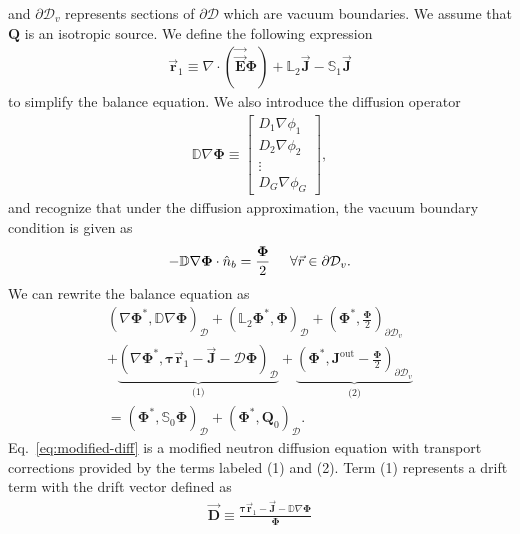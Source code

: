 %
and $\partial\mathcal{D}_v$ represents sections of $\partial\mathcal{D}$ which are vacuum
boundaries. We assume that $\bm{Q}$ is an isotropic source. We define the following expression
%
\begin{gather}
  \vec{\bm{r}}_1 \equiv \nabla\cdot(\vec{\vec{\bm{E}}}\bm{\Phi}) + \mathbb{L}_2\vec{\bm{J}} -
  \mathbb{S}_1\vec{\bm{J}} \label{eq:1st-moment}
\end{gather}
%
to simplify the balance equation. We also introduce the diffusion operator
%
\begin{gather}
  \mathbb{D}\nabla\bm{\Phi} \equiv
  \begin{bmatrix}
    D_1\nabla\phi_1 \\
    D_2\nabla\phi_2 \\
    \vdots \\
    D_G\nabla\phi_G
  \end{bmatrix},
\end{gather}
%
and recognize that under the diffusion approximation, the vacuum boundary condition is given as
%
\begin{gather}
  -\mathbb{D}\nabla\bm{\Phi}\cdot\hat{n}_b = \frac{\bm{\Phi}}{2} \hspace{0.5cm} \forall\vec{r}\in\partial
  \mathcal{D}_v.
\end{gather}
%
We can rewrite the balance equation as
%
\begin{multline}
  \left(\nabla\bm{\Phi}^*, \mathbb{D}\nabla\bm{\Phi}\right)_\mathcal{D}
  + \left(\mathbb{L}_2\bm{\Phi}^*,\bm{\Phi}\right)_\mathcal{D}
  + \left(\bm{\Phi}^*,\frac{\bm{\Phi}}{2}\right)_{\partial\mathcal{D}_v} \\
  + \underbrace{\left(\nabla\bm{\Phi}^*,\bm{\tau}\vec{\bm{r}}_1-\vec{\bm{J}}-\mathcal{D}\bm{\Phi}\right)_\mathcal{D}}_\text{(1)}
  + \underbrace{\left(\bm{\Phi}^*,\bm{J}^\text{out}-\frac{\bm{\Phi}}{2}\right)_{\partial\mathcal{D}_v}}_\text{(2)} \\
  = \left(\bm{\Phi}^*,\mathbb{S}_0\bm{\Phi}\right)_\mathcal{D}
  + \left(\bm{\Phi}^*,\bm{Q}_0\right)_\mathcal{D}. \label{eq:modified-diff}
\end{multline}
%
Eq.\ \ref{eq:modified-diff} is a modified neutron diffusion equation with
transport corrections provided by the terms labeled (1) and (2). Term (1) represents a drift term
with the drift vector defined as
%
\begin{gather}
  \vec{\bm{D}} \equiv \frac{\bm{\tau}\vec{\bm{r}}_1-\vec{\bm{J}}-\mathbb{D}\nabla\bm{\Phi}}{\bm{\Phi}}
\end{gather}

